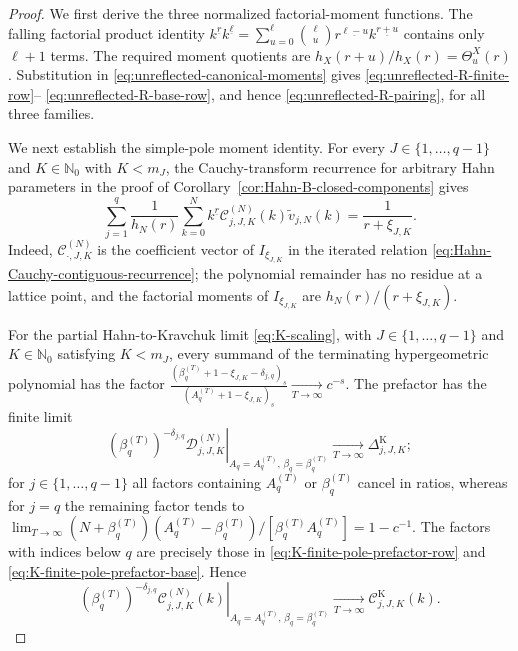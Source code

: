 \documentclass[10pt,a4paper]{amsart}
\newcommand{\Nzero}{\mathbb N_0}
\newcommand{\fall}[2]{#1^{\underline{#2}}}
\begin{document}
\begin{proof}
We first derive the three normalized factorial-moment functions. The falling
factorial product identity
\(\fall{k}{r}\fall{k}{\ell}
=\sum_{u=0}^{\ell}\binom\ell u
\fall{r}{\ell-u}\fall{k}{r+u}\)
contains only \(\ell+1\) terms. The required moment quotients are
\(h_X(r+u)/h_X(r)=\Theta_u^X(r)\).
Substitution in \eqref{eq:unreflected-canonical-moments} gives
\eqref{eq:unreflected-R-finite-row}--
\eqref{eq:unreflected-R-base-row}, and hence
\eqref{eq:unreflected-R-pairing}, for all three families.

We next establish the simple-pole moment identity. For every
\(J\in\{1,\ldots,q-1\}\) and \(K\in\Nzero\) with \(K<m_J\), the
Cauchy-transform recurrence for arbitrary Hahn parameters in the proof of
Corollary~\ref{cor:Hahn-B-closed-components} gives
\begin{equation}
 \sum_{j=1}^q\frac1{h_N(r)}
 \sum_{k=0}^N\fall{k}{r}
 \mathcal C_{j,J,K}^{(N)}(k)
 \widetilde v_{j,N}(k)
 =\frac1{r+\xi_{J,K}}.
 \label{eq:unreflected-Hahn-pairing}
\end{equation}
Indeed, \(\mathcal C_{\cdot,J,K}^{(N)}\) is the coefficient vector of
\(I_{\xi_{J,K}}\) in the iterated relation
\eqref{eq:Hahn-Cauchy-contiguous-recurrence}; the polynomial remainder
has no residue at a lattice point, and the factorial moments of
\(I_{\xi_{J,K}}\) are
\(h_N(r)/(r+\xi_{J,K})\).

For the partial Hahn-to-Kravchuk limit
\eqref{eq:K-scaling}, with \(J\in\{1,\ldots,q-1\}\) and
\(K\in\Nzero\) satisfying \(K<m_J\), every summand of the terminating
hypergeometric polynomial has the factor
\(\frac{(\beta_q^{(T)}+1-\xi_{J,K}-\delta_{j,q})_s}
{(A_q^{(T)}+1-\xi_{J,K})_s}
\xrightarrow[T\to\infty]{}c^{-s}\).
The prefactor has the finite limit
\[
 \left.
 (\beta_q^{(T)})^{-\delta_{j,q}}
 \mathcal D_{j,J,K}^{(N)}
 \right|_{A_q=A_q^{(T)},\,\beta_q=\beta_q^{(T)}}
 \xrightarrow[T\to\infty]{}\Delta_{j,J,K}^{\mathrm K};
\]
for \(j\in\{1,\ldots,q-1\}\) all factors containing \(A_q^{(T)}\) or
\(\beta_q^{(T)}\) cancel in ratios, whereas for \(j=q\) the remaining
factor tends to
\(\lim_{T\to\infty}(N+\beta_q^{(T)})(A_q^{(T)}-\beta_q^{(T)})/
[\beta_q^{(T)}A_q^{(T)}]=1-c^{-1}\).
The factors with indices below \(q\) are precisely those in
\eqref{eq:K-finite-pole-prefactor-row} and
\eqref{eq:K-finite-pole-prefactor-base}.  Hence
\[
 \left.
 (\beta_q^{(T)})^{-\delta_{j,q}}
 \mathcal C_{j,J,K}^{(N)}(k)
 \right|_{A_q=A_q^{(T)},\,\beta_q=\beta_q^{(T)}}
 \xrightarrow[T\to\infty]{}\mathcal C_{j,J,K}^{\mathrm K}(k).
\]


\end{proof}
\end{document}
